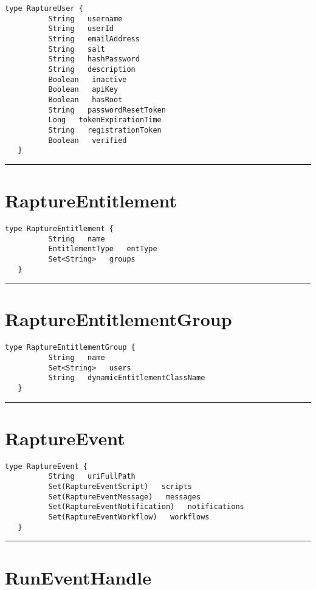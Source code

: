 \begin{lstlisting}[style=nonumbers]
   type RaptureUser {
          String   username
          String   userId
          String   emailAddress
          String   salt
          String   hashPassword
          String   description
          Boolean   inactive
          Boolean   apiKey
          Boolean   hasRoot
          String   passwordResetToken
          Long   tokenExpirationTime
          String   registrationToken
          Boolean   verified
   }
\end{lstlisting}

\rule{12cm}{2pt}
\section{RaptureEntitlement}
\label{type:RaptureEntitlement}

\begin{lstlisting}[style=nonumbers]
   type RaptureEntitlement {
          String   name
          EntitlementType   entType
          Set<String>   groups
   }
\end{lstlisting}

\rule{12cm}{2pt}
\section{RaptureEntitlementGroup}
\label{type:RaptureEntitlementGroup}

\begin{lstlisting}[style=nonumbers]
   type RaptureEntitlementGroup {
          String   name
          Set<String>   users
          String   dynamicEntitlementClassName
   }
\end{lstlisting}

\rule{12cm}{2pt}
\section{RaptureEvent}
\label{type:RaptureEvent}

\begin{lstlisting}[style=nonumbers]
   type RaptureEvent {
          String   uriFullPath
          Set(RaptureEventScript)   scripts
          Set(RaptureEventMessage)   messages
          Set(RaptureEventNotification)   notifications
          Set(RaptureEventWorkflow)   workflows
   }
\end{lstlisting}

\rule{12cm}{2pt}
\section{RunEventHandle}
\label{type:RunEventHandle}

